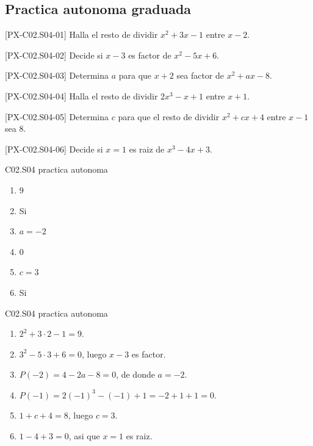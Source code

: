 \subsection*{Practica autonoma graduada}
\begin{exercise}{[PX-C02.S04-01] Halla el resto de dividir \(x^2+3x-1\) entre \(x-2\).}
\end{exercise}
\begin{exercise}{[PX-C02.S04-02] Decide si \(x-3\) es factor de \(x^2-5x+6\).}
\end{exercise}
\begin{exercise}{[PX-C02.S04-03] Determina \(a\) para que \(x+2\) sea factor de \(x^2+ax-8\).}
\end{exercise}
\begin{exercise}{[PX-C02.S04-04] Halla el resto de dividir \(2x^3-x+1\) entre \(x+1\).}
\end{exercise}
\begin{exercise}{[PX-C02.S04-05] Determina \(c\) para que el resto de dividir \(x^2+cx+4\) entre \(x-1\) sea \(8\).}
\end{exercise}
\begin{exercise}{[PX-C02.S04-06] Decide si \(x=1\) es raiz de \(x^3-4x+3\).}
\end{exercise}

\begin{shortanswer}{C02.S04 practica autonoma}
\begin{enumerate}[label=\textbf{PX-C02.S04-\arabic*:}, leftmargin=*]
  \item \(9\)
  \item Si
  \item \(a=-2\)
  \item \(0\)
  \item \(c=3\)
  \item Si
\end{enumerate}
\end{shortanswer}

\begin{fullsolution}{C02.S04 practica autonoma}
\begin{enumerate}[label=\textbf{PX-C02.S04-\arabic*:}, leftmargin=*]
  \item \(2^2+3\cdot 2-1=9\).
  \item \(3^2-5\cdot 3+6=0\), luego \(x-3\) es factor.
  \item \(P(-2)=4-2a-8=0\), de donde \(a=-2\).
  \item \(P(-1)=2(-1)^3-(-1)+1=-2+1+1=0\).
  \item \(1+c+4=8\), luego \(c=3\).
  \item \(1-4+3=0\), asi que \(x=1\) es raiz.
\end{enumerate}
\end{fullsolution}


